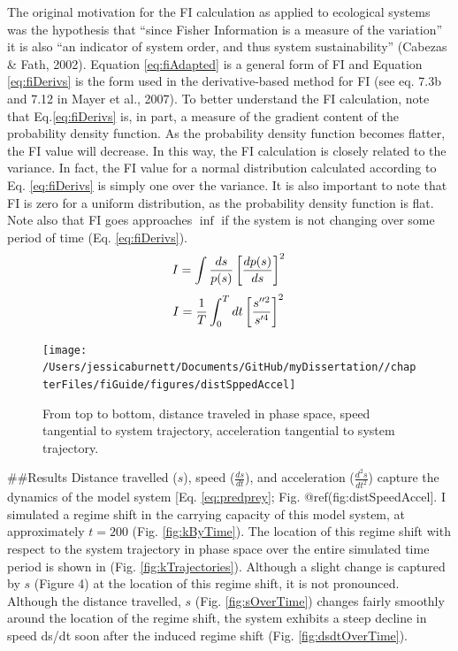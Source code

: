 \documentclass[12pt,twoside,openany]{reedthesis}
\begin{document}
The original motivation for the FI calculation as applied to ecological systems was the hypothesis that ``since Fisher Information is a measure of the variation'' it is also ``an indicator of system order, and thus system sustainability'' (Cabezas \& Fath, 2002). Equation \eqref{eq:fiAdapted} is a general form of FI and Equation \eqref{eq:fiDerivs} is the form used in the derivative-based method for FI (see eq. 7.3b and 7.12 in Mayer et al., 2007). To better understand the FI calculation, note that Eq.\eqref{eq:fiDerivs} is, in part, a measure of the gradient content of the probability density function. As the probability density function becomes flatter, the FI value will decrease. In this way, the FI calculation is closely related to the variance. In fact, the FI value for a normal distribution calculated according to Eq. \eqref{eq:fiDerivs} is simply one over the variance. It is also important to note that FI is zero for a uniform distribution, as the probability density function is flat. Note also that FI goes approaches \(\inf\) if the system is not changing over some period of time (Eq. \eqref{eq:fiDerivs}).
\begin{equation} 
    I = \int \frac{ds}{p(s)}\left[\frac{dp(s)}{ds}\right]^2  \\
    \label{eq:fiAdapted}
\end{equation}
\begin{equation}
    I=\frac{1}{T}\int_0^Tdt\left[\frac{s''^2}{s'^4}\right]^2 \\
  \label{eq:fiDerivs}
\end{equation}
\begin{figure}
\texttt{[image: /Users/jessicaburnett/Documents/GitHub/myDissertation//chapterFiles/fiGuide/figures/distSppedAccel]} \caption{From top to bottom, distance traveled in phase space, speed tangential to system trajectory, acceleration tangential to system trajectory.}\label{fig:distSpeedAccel}
\end{figure}
\#\#Results
Distance travelled (\(s\)), speed (\(\frac{ds}{dt}\)), and acceleration (\(\frac{d^2 s}{dt^2}\)) capture the dynamics of the model system {[}Eq. \eqref{eq:predprey}; Fig. @ref(fig:distSpeedAccel{]}. I simulated a regime shift in the carrying capacity of this model system, at approximately \(t=200\) (Fig. \ref{fig:kByTime}). The location of this regime shift with respect to the system trajectory in phase space over the entire simulated time period is shown in (Fig. \ref{fig:kTrajectories}). Although a slight change is captured by \(s\) (Figure 4) at the location of this regime shift, it is not pronounced. Although the distance travelled, \(s\) (Fig. \ref{fig:sOverTime}) changes fairly smoothly around the location of the regime shift, the system exhibits a steep decline in speed ds/dt soon after the induced regime shift (Fig. \ref{fig:dsdtOverTime}).
\end{document}
